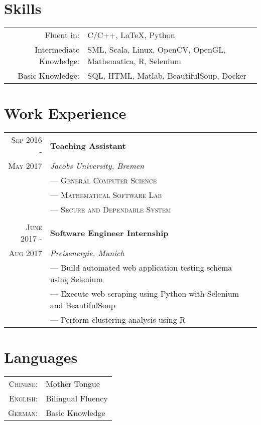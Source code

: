 \documentclass[a4paper,10pt]{article}
\begin{document}
	
	\section{Skills}
	\begin{tabular}{rl}
		Fluent in: & C/C++, LaTeX, Python\\
		Intermediate Knowledge:& SML, Scala, Linux, OpenCV, OpenGL, Mathematica, R, Selenium\\
		Basic Knowledge:& SQL, HTML, Matlab, BeautifulSoup, Docker\\
	\end{tabular}
	
	
	
	\section{Work Experience}
	\begin{tabular}{r|l}
		\textsc{Sep 2016 - } & \textbf{Teaching Assistant} \\\textsc{May 2017}&\emph{Jacobs University, Bremen}
		\\& --- \textsc{General Computer Science}
		\\& --- \textsc{Mathematical Software Lab} 
		\\& --- \textsc{Secure and Dependable System}
		\\ \multicolumn{2}{c}{} \\
		\textsc{June 2017 - } & \textbf{Software Engineer Internship} \\\textsc{Aug 2017}&\emph{Preisenergie, Munich}
		\\& --- Build automated web application testing schema using Selenium
		\\& --- Execute web scraping using Python with Selenium and BeautifulSoup
		\\& --- Perform clustering analysis using R
	\end{tabular}
	
	\section{Languages}
	\begin{tabular}{rl}
		\textsc{Chinese:}& Mother Tongue\\
		\textsc{English:}& Bilingual Fluency\\
		\textsc{German:}& Basic Knowledge\\
	\end{tabular}
	
\end{document}
